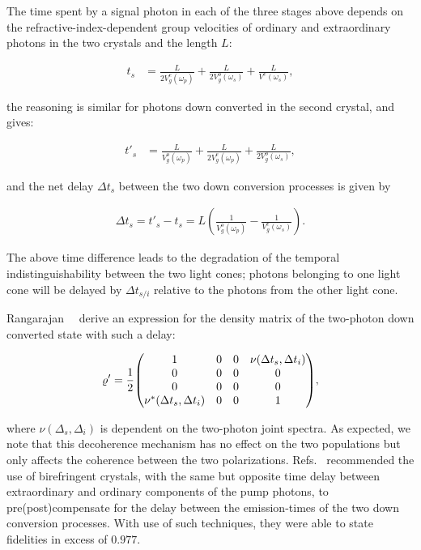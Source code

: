 \noindent
The time spent by a signal photon in each of the three stages above depends on the refractive-index-dependent group velocities of ordinary and extraordinary photons in the two crystals and the length $L$:

\begin{align}
	t_s &= \frac{L}{2V^{e}_g(\omega_p)} + \frac{L}{2V^{o}_g(\omega_s)} +
	\frac{L}{V^{e}(\omega_s)},
\end{align}

\noindent
the reasoning is similar for photons down converted in the second crystal, and gives: 

\begin{align}
	t'_s &= \frac{L}{V^{o}_g(\omega_p)} + \frac{L}{2V^{e}_g(\omega_p)} + \frac{L}{2V^{o}_g(\omega_s)},
\end{align}

and the net delay $\Delta t_s$ between the two down conversion processes is given by

\begin{align}
	\Delta t_s  = t'_s - t_s = L \left(\frac{1}{V^{o}_g(\omega_p)} - \frac{1}{V^{e}_g(\omega_s)} \right).
\end{align}

\noindent
The above time difference leads to the degradation of the temporal indistinguishability between the two light cones; photons belonging to one light cone will be delayed by $\Delta t_{s/i}$ relative to the photons from the other light cone. 

\clearpage
\noindent
Rangarajan~\etal~\cite{Rangarajan_2009} derive an expression for the density matrix of the two-photon down converted state with such a delay:

\begin{align}
	\varrho'  = \frac{1}{2} \mqty(
		1 & 0 & 0 & \nu(\Delta t_s, \Delta t_i) \\
		0 & 0 & 0 & 0 \\
		0 & 0 & 0 & 0 \\
		\nu^*(\Delta t_s, \Delta t_i) & 0 & 0 & 1
	),
\end{align}

\noindent
where $\nu(\Delta_s, \Delta_i)$ is dependent on the two-photon joint spectra. As expected, we note that this decoherence mechanism has no effect on the two populations but only affects the coherence between the two polarizations. Refs.~\cite{Akselrod_2007, Akselrod_err_2007, Rangarajan_2009} recommended the use of birefringent crystals, with the same but opposite time delay between extraordinary and ordinary components of the pump photons, to pre(post)compensate for the delay between the emission-times of the two down conversion processes. With use of such techniques, they were able to state fidelities in excess of $0.977$.

